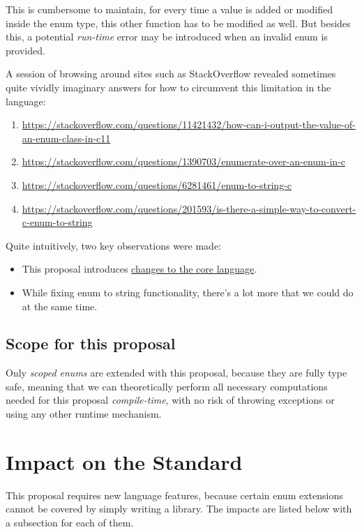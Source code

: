 \documentclass[
  format=manuscript,
  screen=true,
  review=false,
  nonacm=true,
  timestamp=true,
  balance=false]{acmart}
\begin{document}
\noindent
This is cumbersome to maintain, for every time a value is added or modified inside
the enum type, this other function has to be modified as well. But besides this,
a potential \textit{run-time} error may be introduced when an invalid enum is
provided.

A session of browsing around sites such as StackOverflow revealed sometimes quite
vividly imaginary answers for how to circumvent this limitation in the language:

\begin{enumerate}
\item \url{https://stackoverflow.com/questions/11421432/how-can-i-output-the-value-of-an-enum-class-in-c11}
\item \url{https://stackoverflow.com/questions/1390703/enumerate-over-an-enum-in-c}
\item \url{https://stackoverflow.com/questions/6281461/enum-to-string-c}
\item \url{https://stackoverflow.com/questions/201593/is-there-a-simple-way-to-convert-c-enum-to-string}
\end{enumerate}

\noindent
Quite intuitively, two key observations were made:

\begin{itemize}
\item This proposal introduces \underline{changes to the core language}.
\item While fixing enum to string functionality, there's a lot more that we could do at the same time.
\end{itemize}

\subsection{Scope for this proposal}

Only \textit{scoped enums} are extended with this proposal, because they are fully
type safe, meaning that we can theoretically perform all necessary computations needed
for this proposal \textit{compile-time}, with no risk of throwing exceptions or using
any other runtime mechanism.


\section{Impact on the Standard}

This proposal requires new language features, because certain enum extensions cannot
be covered by simply writing a library. The impacts are listed below with a subsection
for each of them.
\end{document}
